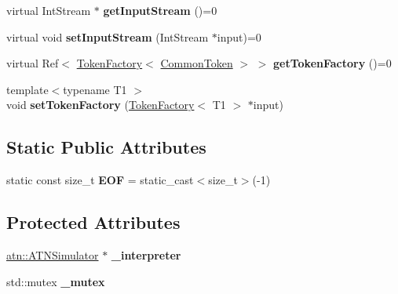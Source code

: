 \begin{DoxyCompactItemize}
\mbox{\label{classantlr4_1_1Recognizer_a297c4019fe7a66dc34a1c6be51e5f2e5}} 
virtual Int\+Stream $\ast$ {\bfseries get\+Input\+Stream} ()=0
\item 
\mbox{\label{classantlr4_1_1Recognizer_a991a206fd8e16fc0f50f3916dfcbae5f}} 
virtual void {\bfseries set\+Input\+Stream} (Int\+Stream $\ast$input)=0
\item 
\mbox{\label{classantlr4_1_1Recognizer_a1b1c211f4c773faf863404b77ed88ee0}} 
virtual Ref$<$ \hyperlink{classantlr4_1_1TokenFactory}{Token\+Factory}$<$ \hyperlink{classantlr4_1_1CommonToken}{Common\+Token} $>$ $>$ {\bfseries get\+Token\+Factory} ()=0
\item 
\mbox{\label{classantlr4_1_1Recognizer_a8970f98d64685141d32128ac90884a07}} 
{\footnotesize template$<$typename T1 $>$ }\\void {\bfseries set\+Token\+Factory} (\hyperlink{classantlr4_1_1TokenFactory}{Token\+Factory}$<$ T1 $>$ $\ast$input)
\end{DoxyCompactItemize}
\subsection*{Static Public Attributes}
\begin{DoxyCompactItemize}
\item 
\mbox{\label{classantlr4_1_1Recognizer_a61757f9d3cfb7d03b4d3b38c077abe5c}} 
static const size\+\_\+t {\bfseries E\+OF} = static\+\_\+cast$<$size\+\_\+t$>$(-\/1)
\end{DoxyCompactItemize}
\subsection*{Protected Attributes}
\begin{DoxyCompactItemize}
\item 
\mbox{\label{classantlr4_1_1Recognizer_a10d4a0c974079f58d5e668072149590a}} 
\hyperlink{classantlr4_1_1atn_1_1ATNSimulator}{atn\+::\+A\+T\+N\+Simulator} $\ast$ {\bfseries \+\_\+interpreter}
\item 
\mbox{\label{classantlr4_1_1Recognizer_a86847db2372c4e6c6f8338b7bd00d946}} 
std\+::mutex {\bfseries \+\_\+mutex}
\end{DoxyCompactItemize}


